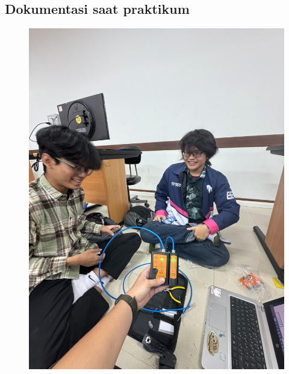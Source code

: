 \subsection{Dokumentasi saat praktikum}
\begin{figure}[H]
	\centering
	\includegraphics[scale=0.05]{P1/img/dokum1.jpg}
\end{figure}
